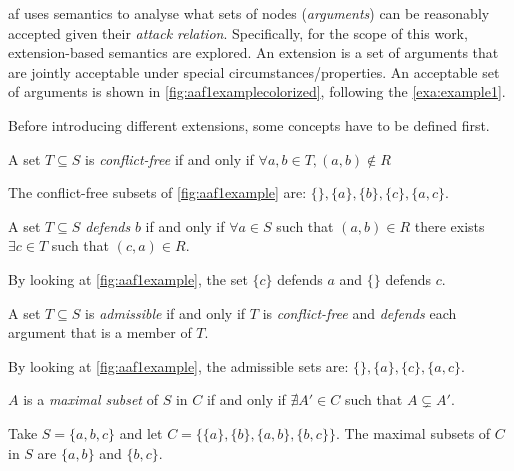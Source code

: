         \gls{af} uses semantics to analyse what sets of nodes (\textit{arguments}) can be reasonably accepted given their \textit{attack relation}. Specifically, for the scope of this work, extension-based semantics are explored. An extension is a set of arguments that are jointly acceptable under special circumstances/properties. An acceptable set of arguments is shown in \autoref{fig:aaf1examplecolorized}, following the \cref{exa:example1}.
        
        
        Before introducing different extensions, some concepts have to be defined first.
        \begin{definition}
            A set $T \subseteq S$ is \textit{conflict-free} if and only if $ \forall a, b \in T, (a, b) \notin R$
            \label{definition:definition2}
        \end{definition}
        \begin{exa}
            The conflict-free subsets of \autoref{fig:aaf1example} are: $\{\}, \{a\}, \{b\}, \{c\}, \{a, c\}$.
            \label{exa:example2}
        \end{exa}
        
        \begin{definition}
            A set $T \subseteq S$ \textit{defends} $b$ if and only if $ \forall a \in S$ such that $(a, b) \in R$ there exists $\exists c \in T$ such that $(c, a) \in R$.
            \label{definition:definition3}
        \end{definition}
        \begin{exa}
            By looking at \autoref{fig:aaf1example}, the set $\{c\}$ defends $a$ and $\{\}$ defends $c$.
            \label{exa:example3}
        \end{exa}
        
        \begin{definition}
            A set $T \subseteq S$ is \textit{admissible} if and only if $T$ is \textit{conflict-free} and \textit{defends} each argument that is a member of $T$.
            \label{definition:definition4}
        \end{definition}
        \begin{exa}
            By looking at \autoref{fig:aaf1example}, the admissible sets are:  $\{\}, \{a\}, \{c\}, \{a, c\}$.
            \label{exa:example4}
        \end{exa}
        
        \begin{definition}
            $A$ is a \textit{maximal subset} of $S$ in $C$ if and only if $\nexists A' \in C$ such that $A \subsetneq A'$.
            \label{definition:definition5}
        \end{definition}
        \begin{exa}
            Take $S = \{a, b, c\}$ and let $C = \{\{a\}, \{b\}, \{a, b\}, \{b, c\}\}$. The maximal subsets of $C$ in $S$ are $\{a, b\}$ and $\{b, c\}$.
            \label{exa:example5}
        \end{exa}
        
